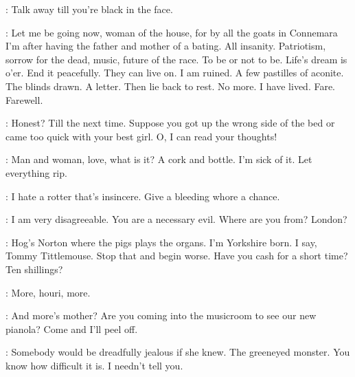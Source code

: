 
\Zoe:
Talk away till you're black in the face.

\Bloom:
Let me be going now, woman of the house,
for by all the goats in Connemara
I'm after having the father and mother of a bating.
All insanity.
Patriotism, sorrow for the dead, music, future of the race.
To be or not to be.
Life's dream is o'er.
End it peacefully.
They can live on.
I am ruined.
A few pastilles of aconite.
The blinds drawn.
A letter.
Then lie back to rest.
No more.
I have lived.
Fare. Farewell.

\Zoe:
Honest?
Till the next time.
Suppose you got up the wrong side of the bed or came too quick with your best girl.
O, I can read your thoughts!

\Bloom:
Man and woman, love, what is it?
A cork and bottle.
I'm sick of it.
Let everything rip.

\Zoe:
I hate a rotter that's insincere.
Give a bleeding whore a chance.

\Bloom:
I am very disagreeable.
You are a necessary evil.
Where are you from?
London?

\Zoe:
Hog's Norton where the pigs plays the organs.
I'm Yorkshire born.
I say, Tommy Tittlemouse.
Stop that and begin worse.
Have you cash for a short time?
Ten shillings?

\Bloom:
More, houri, more.

\Zoe:
And more's mother?
Are you coming into the musicroom to see our new pianola?
Come and I'll peel off.

\Bloom:
Somebody would be dreadfully jealous if she knew.
The greeneyed monster.
You know how difficult it is.
I needn't tell you.

